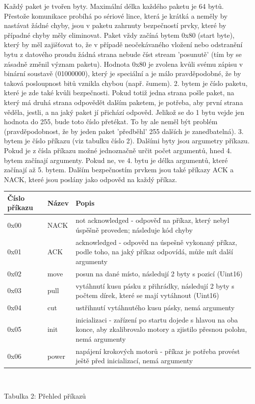 \documentclass[12pt, a4paper, oneside]{article}
\begin{document}
Každý paket je tvořen byty. Maximální délka každého paketu je 64 bytů.
Přestože komunikace probíhá po sériové lince, která je krátká a neměly by nastávat žádné chyby, jsou v paketu zahrnuty bezpečností prvky, které by případné chyby měly eliminovat.
Paket vždy začíná bytem 0x80 (start byte), který by měl zajišťovat to, že v případě neočekávaného vložení nebo odstranění bytu z datového proudu žádná strana nebude číst stream 'posunutě' (tím by se zásadně změnil význam paketu). Hodnota 0x80 je zvolena kvůli svému zápisu v binární soustavě (01000000), který je speciální a je málo pravděpodobné, že by taková posloupnost bitů vznikla chybou (např. šumem).
2. bytem je číslo paketu, které je zde také kvůli bezpečnosti. Pokud totiž jedna strana pošle paket, na který má druhá strana odpovědět dalším paketem, je potřeba, aby první strana věděla, jestli, a na jaký paket jí přichází odpověd. Jelikož se do 1 bytu vejde jen hodnota do 255, bude toto číslo přetékat. To by ale neměl být problém (pravděpodobnost, že by jeden paket 'předběhl' 255 dalších je zanedbatelná).
3. bytem je číslo příkazu (viz tabulku číslo 2).
Dalšími byty jsou argumetry příkazu. Pokud je z čísla příkazu možné jednoznačně určit počet argumentů, hned 4. bytem začínají argumenty. Pokud ne, ve 4. bytu je délka argumentů, které začínají až 5. bytem.
Dalším bezpečnostím prvkem jsou také příkazy ACK a NACK, které jsou poslány jako odpověd na každý příkaz.

\begin{center}
\begin{tabular}{| l | l | p{10 cm} |}
\hline
Číslo příkazu & Název & Popis \\ \hline
0x00 & NACK & not acknowledged - odpověď na příkaz, který nebyl úspěšně proveden; následuje kód chyby \\ \hline
0x01 & ACK & acknowledged - odpověd na úspešně vykonaný příkaz, podle toho, na jaký příkaz odpovídá, může mít další argumenty \\ \hline
0x02 & move & posun na dané místo, následují 2 byty s pozicí (Uint16) \\ \hline
0x03 & pull & vytáhnutí kusu pásku z přihrádky, následují 2 byty s počtem dírek, které se mají vytáhnout (Uint16) \\ \hline
0x04 & cut & ustřihnutí vytáhnutého kusu pásky, nemá argumenty \\ \hline
0x05 & init & inicializaci - zařízení po startu dojede s hlavou na oba konce, aby zkalibrovalo motory a zjistilo přesnou polohu, nemá argumenty \\ \hline
0x06 & power & napájení krokových motorů - příkaz je potřeba provést ještě před inicializací, nemá argumenty \\ \hline
\end{tabular}
\\
\vspace{1mm}
\caption{Tabulka 2: Přehled příkazů}
\end{center}
\end{document}
